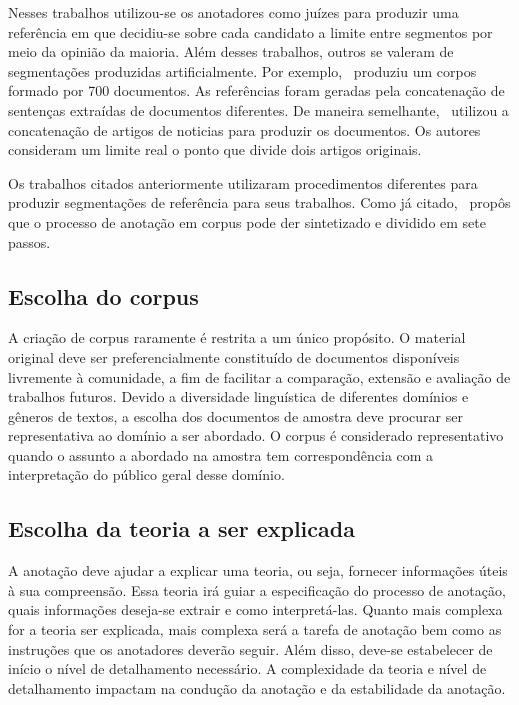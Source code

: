 Nesses trabalhos utilizou-se os anotadores como juízes para produzir uma referência em que decidiu-se sobre cada candidato a limite entre segmentos por meio da opinião da maioria. Além desses trabalhos, outros se valeram de segmentações produzidas artificialmente. Por exemplo,~\cite{Choi2000a} produziu um corpos formado por 700 documentos. As referências foram geradas pela concatenação de sentenças extraídas de documentos diferentes. De maneira semelhante,~\cite{CHAIBI2014} utilizou a concatenação de artigos de noticias para produzir os documentos. Os autores consideram um limite real o ponto que divide dois artigos originais. 



Os trabalhos citados anteriormente utilizaram procedimentos diferentes para produzir segmentações de referência para seus trabalhos. Como já citado,~\cite{Hovy2010} propôs que o processo de anotação em corpus pode der sintetizado e dividido em sete passos. 


\subsection*{Escolha do corpus}
A criação de corpus raramente é restrita a um único propósito. O material original deve ser preferencialmente constituído de documentos disponíveis livremente à comunidade, a fim de facilitar a comparação, extensão e avaliação de trabalhos futuros. 
Devido a diversidade linguística de diferentes domínios e gêneros de textos, a escolha dos documentos de amostra deve procurar ser representativa ao domínio a ser abordado. O corpus é considerado representativo quando o assunto a abordado na amostra tem correspondência com a interpretação do público geral desse domínio.

\subsection*{Escolha da teoria a ser explicada}
A anotação deve ajudar a explicar uma teoria, ou seja, fornecer informações úteis à sua compreensão. Essa teoria irá guiar a especificação do processo de anotação, quais informações deseja-se extrair e como interpretá-las. Quanto mais complexa for a teoria ser explicada, mais complexa será a tarefa de anotação bem como as instruções que os anotadores deverão seguir. Além disso, deve-se estabelecer de início o nível de detalhamento necessário. 
A complexidade da teoria e nível de detalhamento impactam na condução da anotação e da estabilidade da anotação.

